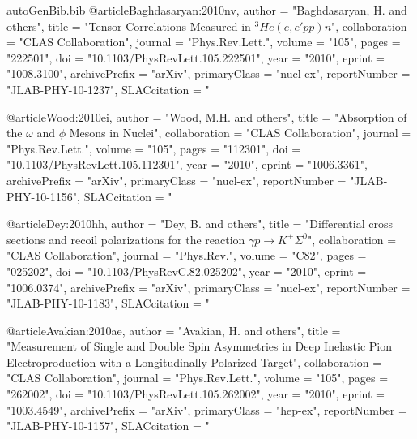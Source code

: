\begin{filecontents*}{autoGenBib.bib}
@article{Baghdasaryan:2010nv,
      author         = "Baghdasaryan, H. and others",
      title          = "{Tensor Correlations Measured in $^3He(e,e'pp)n$}",
      collaboration  = "CLAS Collaboration",
      journal        = "Phys.Rev.Lett.",
      volume         = "105",
      pages          = "222501",
      doi            = "10.1103/PhysRevLett.105.222501",
      year           = "2010",
      eprint         = "1008.3100",
      archivePrefix  = "arXiv",
      primaryClass   = "nucl-ex",
      reportNumber   = "JLAB-PHY-10-1237",
      SLACcitation   = "%
}

@article{Wood:2010ei,
      author         = "Wood, M.H. and others",
      title          = "{Absorption of the $\omega$ and $\phi$ Mesons in Nuclei}",
      collaboration  = "CLAS Collaboration",
      journal        = "Phys.Rev.Lett.",
      volume         = "105",
      pages          = "112301",
      doi            = "10.1103/PhysRevLett.105.112301",
      year           = "2010",
      eprint         = "1006.3361",
      archivePrefix  = "arXiv",
      primaryClass   = "nucl-ex",
      reportNumber   = "JLAB-PHY-10-1156",
      SLACcitation   = "%
}

@article{Dey:2010hh,
      author         = "Dey, B. and others",
      title          = "{Differential cross sections and recoil polarizations for
                        the reaction $\gamma p \rightarrow K^+ \Sigma^0$}",
      collaboration  = "CLAS Collaboration",
      journal        = "Phys.Rev.",
      volume         = "C82",
      pages          = "025202",
      doi            = "10.1103/PhysRevC.82.025202",
      year           = "2010",
      eprint         = "1006.0374",
      archivePrefix  = "arXiv",
      primaryClass   = "nucl-ex",
      reportNumber   = "JLAB-PHY-10-1183",
      SLACcitation   = "%
}

@article{Avakian:2010ae,
      author         = "Avakian, H. and others",
      title          = "{Measurement of Single and Double Spin Asymmetries in
                        Deep Inelastic Pion Electroproduction with a
                        Longitudinally Polarized Target}",
      collaboration  = "CLAS Collaboration",
      journal        = "Phys.Rev.Lett.",
      volume         = "105",
      pages          = "262002",
      doi            = "10.1103/PhysRevLett.105.262002",
      year           = "2010",
      eprint         = "1003.4549",
      archivePrefix  = "arXiv",
      primaryClass   = "hep-ex",
      reportNumber   = "JLAB-PHY-10-1157",
      SLACcitation   = "%
}


\end{filecontents*}
